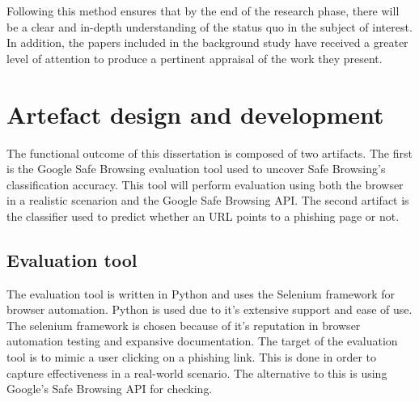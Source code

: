 Following this method ensures that by the end of the research phase, there will be a clear and in-depth understanding of the status quo in the subject of interest. In addition, the papers included in the background study have received a greater level of attention to produce a pertinent appraisal of the work they present.


\section{Artefact design and development}
The functional outcome of this dissertation is composed of two artifacts. The first is the Google Safe Browsing evaluation tool used to uncover Safe Browsing's classification accuracy. This tool will perform evaluation using both the browser in a realistic scenarion and the Google Safe Browsing API. The second artifact is the classifier used to predict whether an URL points to a phishing page or not.

\subsection{Evaluation tool}
The evaluation tool is written in Python and uses the Selenium framework for browser automation. Python is used due to it's extensive support and ease of use. The selenium framework is chosen because of it's reputation in browser automation testing and expansive documentation. The target of the evaluation tool is to mimic a user clicking on a phishing link. This is done in order to capture effectiveness in a real-world scenario. The alternative to this is using Google's Safe Browsing API for checking.

